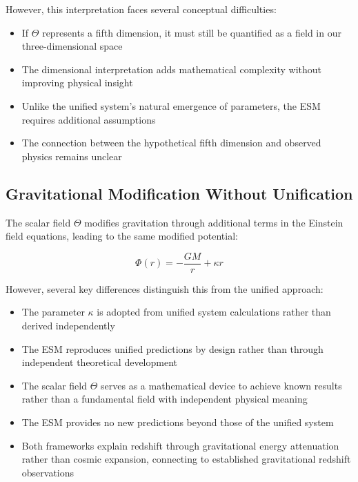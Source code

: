 	However, this interpretation faces several conceptual difficulties:
	
	\begin{itemize}
		\item If $\Theta$ represents a fifth dimension, it must still be quantified as a field in our three-dimensional space
		\item The dimensional interpretation adds mathematical complexity without improving physical insight
		\item Unlike the unified system's natural emergence of parameters, the ESM requires additional assumptions
		\item The connection between the hypothetical fifth dimension and observed physics remains unclear
	\end{itemize}
	
	\subsection{Gravitational Modification Without Unification}
	\label{subsec:gravitational_modification_esm}
	
	The scalar field $\Theta$ modifies gravitation through additional terms in the Einstein field equations, leading to the same modified potential:
	
	\begin{equation}
		\Phi(r) = -\frac{GM}{r} + \kappa r
	\end{equation}
	
	However, several key differences distinguish this from the unified approach:
	
	\begin{itemize}
		\item The parameter $\kappa$ is adopted from unified system calculations rather than derived independently
		\item The ESM reproduces unified predictions by design rather than through independent theoretical development
		\item The scalar field $\Theta$ serves as a mathematical device to achieve known results rather than a fundamental field with independent physical meaning
		\item The ESM provides no new predictions beyond those of the unified system
		\item Both frameworks explain redshift through gravitational energy attenuation rather than cosmic expansion, connecting to established gravitational redshift observations \cite{Adams1925,Shapiro1971}
	\end{itemize}
	
